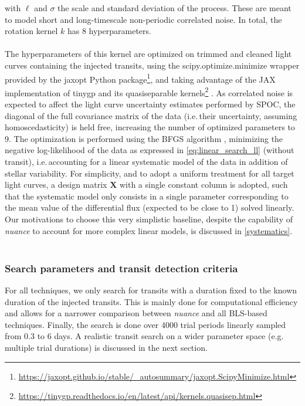 \documentclass[modern]{aastex631}
\newcommand{\nuancemethod}{\textit{nuance}}
\newcommand{\footlink}[1]{\footnote{\url{#1}}}
\begin{document}
with $\ell$ and $\sigma$ the scale and standard deviation of the process. These are meant to model short and long-timescale non-periodic correlated noise. In total, the rotation kernel $k$ has 8 hyperparameters.\\\\
The hyperparameters of this kernel are optimized on trimmed and cleaned light curves containing the injected transits, using the \textsf{scipy.optimize.minimize} wrapper provided by the \textsf{jaxopt} Python package\footlink{https://jaxopt.github.io/stable/_autosummary/jaxopt.ScipyMinimize.html}, and taking advantage of the \textsf{JAX} implementation of \textsf{tinygp} and its quasiseparable kernels\footlink{https://tinygp.readthedocs.io/en/latest/api/kernels.quasisep.html} \citep{celerite}. As correlated noise is expected to affect the light curve uncertainty estimates performed by SPOC, the diagonal of the full covariance matrix of the data (i.e.\,their uncertainty, assuming homoscedasticity) is held free, increasing the number of optimized parameters to 9. The optimization is performed using the \textsf{BFGS} algorithm \citep{Fletcher1987}, minimizing the negative log-likelihood of the data as expressed in \autoref{eq:linear_search_ll} (without transit), i.e.\,accounting for a linear systematic model of the data in addition of stellar variability. For simplicity, and to adopt a uniform treatment for all target light curves, a design matrix $\bm{X}$ with a single constant column is adopted, such that the systematic model only consists in a single parameter corresponding to the mean value of the differential flux (expected to be close to 1) solved linearly. Our motivations to choose this very simplistic baseline, despite the capability of \nuancemethod{} to account for more complex linear models, is discussed in \autoref{systematics}.\\\\
\subsubsection*{Search parameters and transit detection criteria}
For all techniques, we only search for transits with a duration fixed to the known duration of the injected transits. This is mainly done for computational efficiency and allows for a narrower comparison between \nuancemethod{} and all BLS-based techniques. Finally, the search is done over 4000 trial periods linearly sampled from 0.3 to 6 days. A realistic transit search on a wider parameter space (e.g. multiple trial durations) is discussed in the next section.
\end{document}
